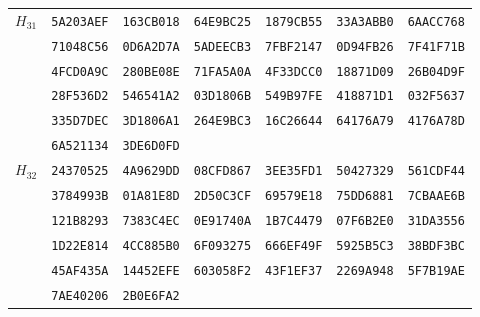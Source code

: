 \begin{table}
\begin{tabular}{@{}ccccccc@{}}
\midrule
\multirow{6}{*}{$H_{31}$}
 & \texttt{5A203AEF} & \texttt{163CB018} & \texttt{64E9BC25} & \texttt{1879CB55} & \texttt{33A3ABB0} & \texttt{6AACC768}\\
 & \texttt{71048C56} & \texttt{0D6A2D7A} & \texttt{5ADEECB3} & \texttt{7FBF2147} & \texttt{0D94FB26} & \texttt{7F41F71B}\\
 & \texttt{4FCD0A9C} & \texttt{280BE08E} & \texttt{71FA5A0A} & \texttt{4F33DCC0} & \texttt{18871D09} & \texttt{26B04D9F}\\
 & \texttt{28F536D2} & \texttt{546541A2} & \texttt{03D1806B} & \texttt{549B97FE} & \texttt{418871D1} & \texttt{032F5637}\\
 & \texttt{335D7DEC} & \texttt{3D1806A1} & \texttt{264E9BC3} & \texttt{16C26644} & \texttt{64176A79} & \texttt{4176A78D}\\
 & \texttt{6A521134} & \texttt{3DE6D0FD}\\

\midrule
\multirow{6}{*}{$H_{32}$}
 & \texttt{24370525} & \texttt{4A9629DD} & \texttt{08CFD867} & \texttt{3EE35FD1} & \texttt{50427329} & \texttt{561CDF44}\\
 & \texttt{3784993B} & \texttt{01A81E8D} & \texttt{2D50C3CF} & \texttt{69579E18} & \texttt{75DD6881} & \texttt{7CBAAE6B}\\
 & \texttt{121B8293} & \texttt{7383C4EC} & \texttt{0E91740A} & \texttt{1B7C4479} & \texttt{07F6B2E0} & \texttt{31DA3556}\\
 & \texttt{1D22E814} & \texttt{4CC885B0} & \texttt{6F093275} & \texttt{666EF49F} & \texttt{5925B5C3} & \texttt{38BDF3BC}\\
 & \texttt{45AF435A} & \texttt{14452EFE} & \texttt{603058F2} & \texttt{43F1EF37} & \texttt{2269A948} & \texttt{5F7B19AE}\\
 & \texttt{7AE40206} & \texttt{2B0E6FA2}\\

\bottomrule
\end{tabular}
\end{table}

